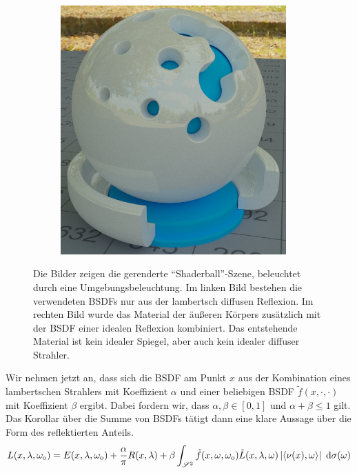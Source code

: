 \begin{figure}[h]
\begin{subfigure}[b]{0.5\textwidth}
				\includegraphics[width=0.95\textwidth]{pic/shaderball-bsdf_sum-specular.png}
			\end{subfigure}
			\caption[Wirkung zusammengesetzter Materialien anhand der \enquote{Shaderball}-Szene]{Die Bilder zeigen die gerenderte \enquote{Shaderball}-Szene, beleuchtet durch eine Umgebungsbeleuchtung. Im linken Bild bestehen die verwendeten BSDFs nur aus der lambertsch diffusen Reflexion. Im rechten Bild wurde das Material der äußeren Körpers zusätzlich mit der BSDF einer idealen Reflexion kombiniert. Das entstehende Material ist kein idealer Spiegel, aber auch kein idealer diffuser Strahler.}
			\label{fig:shaderball-bsdf-sum}
		\end{figure}

		Wir nehmen jetzt an, dass sich die BSDF am Punkt $x$ aus der Kombination eines lambertschen Strahlers mit Koeffizient $\alpha$ und einer beliebigen BSDF $\tilde{f}(x,\cdot,\cdot)$ mit Koeffizient $\beta$ ergibt.
		Dabei fordern wir, dass $\alpha,\beta\in[0,1]$ und $\alpha +\beta\leq 1$ gilt.
		Das Korollar über die Summe von BSDFs tätigt dann eine klare Aussage über die Form des reflektierten Anteils.
		\[
			L(x,\lambda,\omega_{\mathrm{o}}) = E(x,\lambda,\omega_{\mathrm{o}}) + \frac{\alpha}{\pi}R(x,\lambda) + \beta \int_{\mathscr{S}^{2}}^{} \tilde{f}(x,\omega,\omega_{\mathrm{o}})\tilde{L}(x,\lambda,\omega)\left\vert \left\langle \nu(x),\omega \right\rangle \right\vert\ \mathrm{d} \sigma(\omega)
		\]

